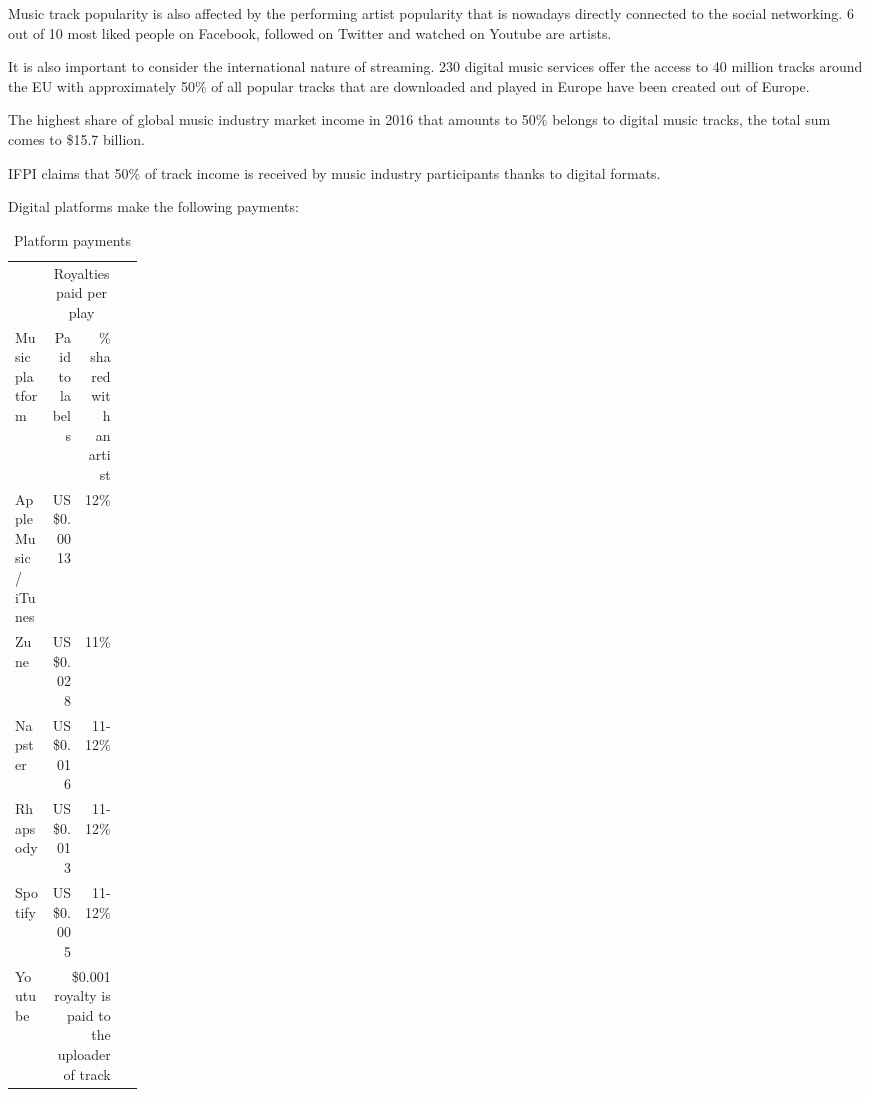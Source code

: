 \documentclass[12pt]{report}
\newcommand{\hlc}[1]{\colorbox{yellow!25}{#1}}
\begin{document}
Music track popularity is also affected by the performing artist popularity that is nowadays directly connected to the social networking. 6 out of 10 most liked people on Facebook, followed on Twitter and watched on Youtube are artists.

It is also important to consider the international nature of streaming. 230 digital music services offer the access to 40 million tracks around the EU with approximately 50\% of all popular tracks that are downloaded and played in Europe have been created out of Europe.

The highest share of global music industry market income in 2016 that amounts to 50\% belongs to digital music tracks, the total sum comes to \$15.7 billion.
 
IFPI claims that 50\% of track income is received by music industry participants thanks to digital formats.
 
Digital platforms make the following payments:

\def\PayPlay{Royalties paid per play}
\def\PayBuy{Оплата при покупке песни}
\def\Platform{Music platform}
\def\LabelPartion{Paid to labels}
\def\ArtistPartion{\hlc{\% shared with an artist}}
\def\YoutubePay{\$0.001 royalty is paid to the uploader of track}

\begin{table}[H]
\centering
\caption{Platform payments}
\begin{tabular}{lrrp{0.15\linewidth}}
\toprule
	& \multicolumn{2}{c}{\PayPlay} \\
	\Platform & 
	\multicolumn{1}{p{0.22\linewidth}}{\LabelPartion} &
	\multicolumn{1}{p{0.22\linewidth}}{\ArtistPartion} \\
\bottomrule
\midrule
Apple Music / iTunes		& US \$0.0013 	& 12\% \\
Zune								& US \$0.028 	& 11\% \\
Napster						& US \$0.016 	& 11-12\% \\
Rhapsody						& US \$0.013 	& 11-12\% \\
Spotify							& US \$0.005 	& 11-12\% \\
Youtube 						& \multicolumn{2}{p{0.48\linewidth}}{\YoutubePay} \\
\bottomrule
\end{tabular}
\end{table}


\vfill\null\pagebreak
\end{document}

